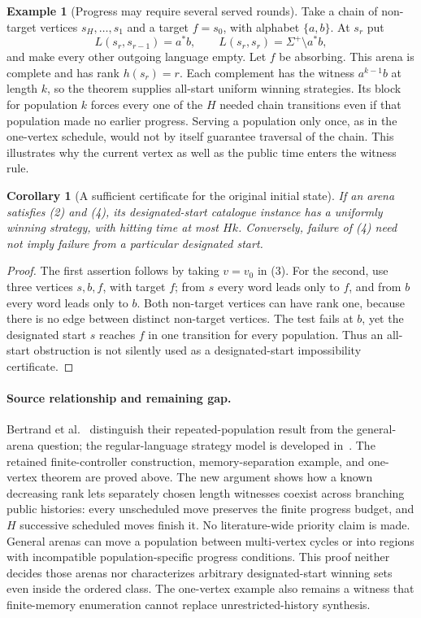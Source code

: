 \documentclass[11pt]{article}
\newtheorem{corollary}{Corollary}
\theoremstyle{definition}
\newtheorem{example}{Example}
\theoremstyle{remark}
\begin{document}
\begin{example}[Progress may require several served rounds]
Take a chain of non-target vertices $s_H,\ldots,s_1$ and a target $f=s_0$,
with alphabet $\{a,b\}$. At $s_r$ put
\[
 L(s_r,s_{r-1})=a^*b,\qquad
 L(s_r,s_r)=\Sigma^+\setminus a^*b,
\]
and make every other outgoing language empty. Let $f$ be absorbing. This
arena is complete and has rank $h(s_r)=r$. Each complement has the witness
$a^{k-1}b$ at length $k$, so the theorem supplies all-start uniform winning
strategies. Its block for population $k$ forces every one of the $H$
needed chain transitions even if that population made no earlier progress.
Serving a population only once, as in the one-vertex schedule, would not
by itself guarantee traversal of the chain. This illustrates why the
current vertex as well as the public time enters the witness rule.
\end{example}

\begin{corollary}[A sufficient certificate for the original initial state]
If an arena satisfies (2) and (4), its designated-start catalogue instance
has a uniformly winning strategy, with hitting time at most $Hk$. Conversely,
failure of (4) need not imply failure from a particular designated start.
\end{corollary}
\begin{proof}
The first assertion follows by taking $v=v_0$ in (3). For the second, use
three vertices $s,b,f$, with target $f$; from $s$ every word leads only to
$f$, and from $b$ every word leads only to $b$. Both non-target vertices can
have rank one, because there is no edge between distinct non-target
vertices. The test fails at $b$, yet the designated start $s$ reaches $f$
in one transition for every population. Thus an all-start obstruction is
not silently used as a designated-start impossibility certificate.
\end{proof}

\paragraph{Source relationship and remaining gap.}
Bertrand et al.~\cite{reach} distinguish their repeated-population result
from the general-arena question; the regular-language strategy model is
developed in~\cite{safe}. The retained finite-controller construction,
memory-separation example, and one-vertex theorem are proved above. The
new argument shows how a known decreasing rank lets separately chosen
length witnesses coexist across branching public histories: every
unscheduled move preserves the finite progress budget, and $H$ successive
scheduled moves finish it. No literature-wide priority claim is made.
General arenas can move a population between multi-vertex cycles or into
regions with incompatible population-specific progress conditions. This
proof neither decides those arenas nor characterizes arbitrary
designated-start winning sets even inside the ordered class. The
one-vertex example also remains a witness that finite-memory enumeration
cannot replace unrestricted-history synthesis.
\end{document}
